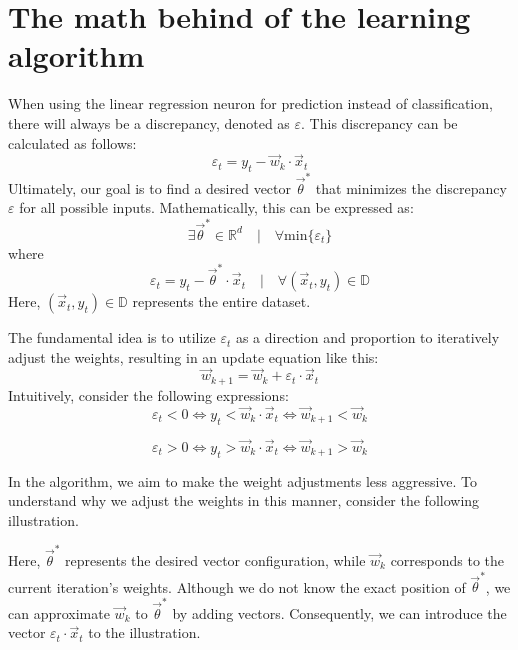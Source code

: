 \section{The math behind of the learning algorithm}
When using the linear regression neuron for prediction instead of classification, there will always
be a discrepancy, denoted as $\varepsilon$. This discrepancy can be calculated as follows:
\[
\varepsilon_t = y_t - \vec{w}_k \cdot \vec{x}_t
\]
Ultimately, our goal is to find a desired vector $\vec{\theta}^*$ that minimizes the
discrepancy $\varepsilon$ for all possible inputs. Mathematically, this can be expressed as:
\[
\exists \vec{\theta}^* \in \mathbb{R}^{d} \quad|\quad \forall \text{min}\{\varepsilon_t\}
\]
where
\[
\varepsilon_t = y_t - \vec{\theta}^* \cdot \vec{x}_t\quad|\quad \forall(\vec{x}_t, y_t) \in \mathbb{D}
\]
Here, $(\vec{x}_t, y_t) \in \mathbb{D}$ represents the entire dataset.

The fundamental idea is to utilize $\varepsilon_t$ as a direction and proportion to iteratively
adjust the weights, resulting in an update equation like this:
\[
\vec{w}_{k + 1} = \vec{w}_{k} + \varepsilon_t \cdot \vec{x}_t
\]
Intuitively, consider the following expressions:
\[
\varepsilon_t < 0 \Longleftrightarrow y_t < \vec{w}_k \cdot \vec{x}_t
\Longleftrightarrow \vec{w}_{k + 1} < \vec{w}_k
\]

\[
\varepsilon_t > 0 \Longleftrightarrow y_t > \vec{w}_k \cdot \vec{x}_t
\Longleftrightarrow \vec{w}_{k + 1} > \vec{w}_k
\]

In the algorithm, we aim to make the weight adjustments less aggressive.
To understand why we adjust the weights in this manner, consider the following illustration.

\begin{center}
\end{center}

Here, $\vec{\theta}^*$ represents the desired vector configuration, while $\vec{w}_k$ corresponds to the
current iteration's weights. Although we do not know the exact position of $\vec{\theta}^*$, we
can approximate $\vec{w}_k$ to $\vec{\theta}^*$ by adding vectors. Consequently, we can introduce
the vector $\varepsilon_t \cdot \vec{x}_t$ to the illustration.

